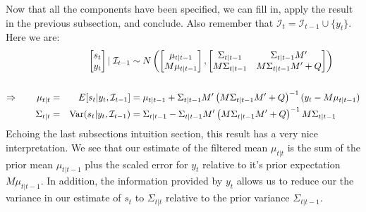 \documentclass[a4paper,12pt]{article}
\begin{document}
Now that all the components have been specified, we can
fill in, apply the result in the previous subsection, and
conclude. Also remember that
$\mathcal{I}_{t}=\mathcal{I}_{t-1} \cup \{y_t\}$. Here we
are:
\begin{alignat}{3}
  &&\begin{bmatrix} s_t \\ y_t \end{bmatrix} | \; 
  \mathcal{I}_{t-1}
  &\sim 
  N\left(\begin{bmatrix} \mu_{t|t-1} \\ M\mu_{t|t-1} 
    \end{bmatrix},
  \begin{bmatrix} 
    \Sigma_{t|t-1} & \Sigma_{t|t-1} M'
    \notag\\
    M\Sigma_{t|t-1} & M\Sigma_{t|t-1}M' + Q 
  \end{bmatrix} 
  \right) \notag\\\label{normfilt}\\
  \Rightarrow \qquad
  \mu_{t|t} =&& E[s_t|y_t, \mathcal{I}_{t-1}]
    &= \mu_{t|t-1} + \Sigma_{t|t-1} M' 
    \left(M\Sigma_{t|t-1}M' + Q\right)^{-1} (y_t-M\mu_{t|t-1}) \notag\\
  \Sigma_{t|t} =&& 
    \text{Var}(s_t|y_t, \mathcal{I}_{t-1})
    &= \Sigma_{t|t-1} - \Sigma_{t|t-1}M' 
    \left(M\Sigma_{t|t-1}M' + Q\right)^{-1} M\Sigma_{t|t-1} \notag
\end{alignat}
Echoing the last subsections intuition section, this
result has a very nice interpretation. We see that our
estimate of the filtered mean $\mu_{t|t}$ is the sum of
the prior mean $\mu_{t|t-1}$ plus the scaled error for
$y_t$ relative to it's prior expectation $M\mu_{t|t-1}$.
In addition, the information provided by $y_t$ allows us
to reduce our the variance in our estimate of $s_t$ to
$\Sigma_{t|t}$ relative to the prior variance
$\Sigma_{t|t-1}$.
\end{document}
